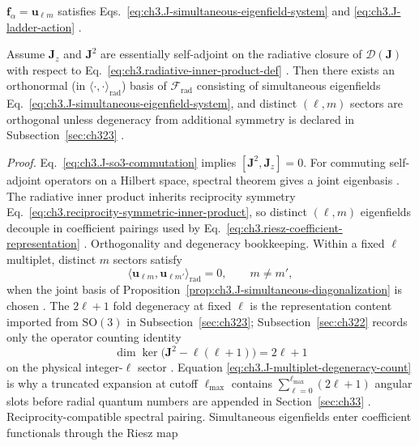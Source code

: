 \(\mathbf{f}_\alpha=\mathbf{u}_{\ell m}\) satisfies Eqs.~\eqref{eq:ch3.J-simultaneous-eigenfield-system} and
\eqref{eq:ch3.J-ladder-action} .
\begin{proposition}
\label{prop:ch3.J-simultaneous-diagonalization}
Assume \(\mathbf{J}_{z}\) and \(\mathbf{J}^{2}\) are essentially self-adjoint on the radiative closure of
\(\mathcal{D}(\mathbf{J})\) with respect to Eq.~\eqref{eq:ch3.radiative-inner-product-def}
. Then there exists an orthonormal (in \(\langle\cdot,\cdot\rangle_{\mathrm{rad}}\))
basis of \(\mathcal{F}_{\mathrm{rad}}\) consisting of simultaneous eigenfields
Eq.~\eqref{eq:ch3.J-simultaneous-eigenfield-system}, and distinct \((\ell,m)\) sectors are orthogonal unless
degeneracy from additional symmetry is declared in Subsection~\ref{sec:ch323} .
\end{proposition}
\noindent\textit{Proof.}
Eq.~\eqref{eq:ch3.J-so3-commutation} implies \([\mathbf{J}^{2},\mathbf{J}_{z}]=0\). For commuting self-adjoint
operators on a Hilbert space, spectral theorem gives a joint eigenbasis . The
radiative inner product inherits reciprocity symmetry Eq.~\eqref{eq:ch3.reciprocity-symmetric-inner-product},
so distinct \((\ell,m)\) eigenfields decouple in coefficient pairings used by
Eq.~\eqref{eq:ch3.riesz-coefficient-representation} .
Orthogonality and degeneracy bookkeeping. Within a fixed \(\ell\) multiplet, distinct \(m\) sectors satisfy
\begin{equation}
\label{eq:ch3.J-m-orthogonality}
\langle \mathbf{u}_{\ell m},\mathbf{u}_{\ell m'}\rangle_{\mathrm{rad}}
=
0,
\qquad
m\neq m',
\end{equation}
when the joint basis of Proposition~\ref{prop:ch3.J-simultaneous-diagonalization} is chosen
. The \(2\ell+1\) fold degeneracy at fixed \(\ell\) is the representation
content imported from \(\mathrm{SO}(3)\) in Subsection~\ref{sec:ch323}; Subsection~\ref{sec:ch322} records only
the operator counting identity
\begin{equation}
\label{eq:ch3.J-multiplet-degeneracy-count}
\dim\ker\big(\mathbf{J}^{2}-\ell(\ell+1)\big)
=
2\ell+1
\end{equation}
on the physical integer-\(\ell\) sector . Equation
\eqref{eq:ch3.J-multiplet-degeneracy-count} is why a truncated expansion at cutoff \(\ell_{\max}\) contains
\(\sum_{\ell=0}^{\ell_{\max}}(2\ell+1)\) angular slots before radial quantum numbers are appended in
Section~\ref{sec:ch33} .
Reciprocity-compatible spectral pairing. Simultaneous eigenfields enter coefficient functionals through the Riesz map
